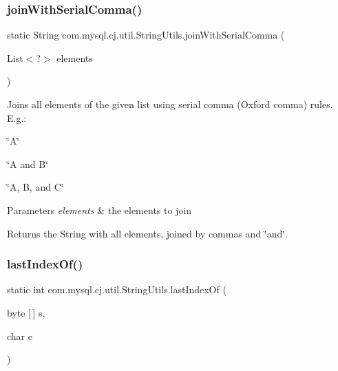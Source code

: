 \mbox{\label{classcom_1_1mysql_1_1cj_1_1util_1_1_string_utils_afa316f29440d108b71338a160eeb4868}} 
\subsubsection{\texorpdfstring{join\+With\+Serial\+Comma()}{joinWithSerialComma()}}
{\footnotesize\ttfamily static String com.\+mysql.\+cj.\+util.\+String\+Utils.\+join\+With\+Serial\+Comma (\begin{DoxyParamCaption}\item[{List$<$?$>$}]{elements }\end{DoxyParamCaption})\hspace{0.3cm}{\ttfamily [static]}}

Joins all elements of the given list using serial comma (Oxford comma) rules. E.\+g.\+:
\begin{DoxyItemize}
\item \char`\"{}\+A\char`\"{}
\item \char`\"{}\+A and B\char`\"{}
\item \char`\"{}\+A, B, and C\char`\"{}
\end{DoxyItemize}


\begin{DoxyParams}{Parameters}
{\em elements} & the elements to join \\
\hline
\end{DoxyParams}
\begin{DoxyReturn}{Returns}
the String with all elements, joined by commas and \char`\"{}and\char`\"{}. 
\end{DoxyReturn}
\mbox{\label{classcom_1_1mysql_1_1cj_1_1util_1_1_string_utils_a6eaaf0103913b8b7a82858ae20acf001}} 
\subsubsection{\texorpdfstring{last\+Index\+Of()}{lastIndexOf()}}
{\footnotesize\ttfamily static int com.\+mysql.\+cj.\+util.\+String\+Utils.\+last\+Index\+Of (\begin{DoxyParamCaption}\item[{byte \mbox{[}$\,$\mbox{]}}]{s,  }\item[{char}]{c }\end{DoxyParamCaption})\hspace{0.3cm}{\ttfamily [static]}}

